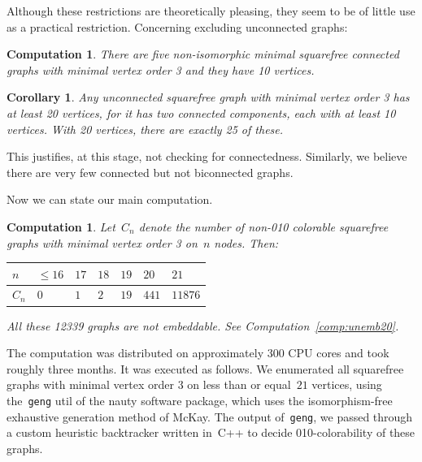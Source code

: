 \documentclass[adraft,copyright,creativecommons]{eptcs}
\newcounter{main}
\newtheorem{comp}[main]{Computation}
\newtheorem{cor}[main]{Corollary}
\theoremstyle{definition}
\theoremstyle{remark}
\begin{document}
Although these restrictions are theoretically pleasing,
they seem to be of little use as a practical restriction.
Concerning excluding unconnected graphs:
\begin{comp}
    There are five non-isomorphic minimal
    squarefree connected graphs
    with minimal vertex order 3 and they have 10 vertices.
\end{comp}
\begin{cor}
    Any unconnected
    squarefree graph with minimal vertex order 3
    has at least 20 vertices, for it has two connected components,
    each with at least 10 vertices.
    With 20 vertices, there are exactly 25 of these.
\end{cor}
This justifies, at this stage, not checking for connectedness.
Similarly, we believe there are very few connected but not biconnected graphs.

Now we can state our main computation.
\begin{comp}
    Let~$C_n$ denote the number of non-010 colorable squarefree
    graphs with minimal vertex order 3 on~$n$ nodes.  Then:

    \begin{center}
    \begin{tabular}{l|llllll}
        $n$ & $\leq 16$
            & $17$
            & $18$
            & $19$
            & $20$
            & $21$ \\
        \hline
        $C_n$ & $0$
            & $1$
            & $2$
            & $19$
            & $441$
            & $11876$
    \end{tabular}
    \end{center}

    All these 12339 graphs are not embeddable.
    See Computation~\ref{comp:unemb20}.
\end{comp}
The computation was distributed on approximately 300 CPU cores
and took roughly three months.
It was executed as follows.
We enumerated all squarefree graphs with minimal vertex
order 3 on less than or equal~$21$ vertices,
using the~\texttt{geng} util of the nauty software package,
which uses the isomorphism-free exhaustive generation
method of McKay\cite{geng}.
The output of~\texttt{geng}, we passed through
a custom heuristic backtracker written in~C++
to decide 010-colorability of these graphs.
\end{document}
